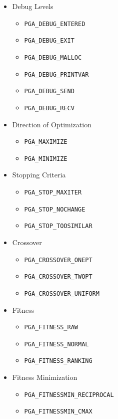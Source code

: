 \documentclass{report}
\begin{document}
\begin{itemize}
\item Debug Levels
\begin{itemize}
\item {\tt PGA\_DEBUG\_ENTERED}
\item {\tt PGA\_DEBUG\_EXIT}
\item {\tt PGA\_DEBUG\_MALLOC}
\item {\tt PGA\_DEBUG\_PRINTVAR}
\item {\tt PGA\_DEBUG\_SEND}
\item {\tt PGA\_DEBUG\_RECV}
\end{itemize}


\item Direction of Optimization
\begin{itemize}
\item {\tt PGA\_MAXIMIZE}
\item {\tt PGA\_MINIMIZE}
\end{itemize}
    
\item Stopping Criteria
\begin{itemize}
\item {\tt PGA\_STOP\_MAXITER}
\item {\tt PGA\_STOP\_NOCHANGE}
\item {\tt PGA\_STOP\_TOOSIMILAR}
\end{itemize}

\item Crossover
\begin{itemize}
\item {\tt PGA\_CROSSOVER\_ONEPT}
\item {\tt PGA\_CROSSOVER\_TWOPT}
\item {\tt PGA\_CROSSOVER\_UNIFORM}
\end{itemize}

\item Fitness
\begin{itemize}
\item {\tt PGA\_FITNESS\_RAW}
\item {\tt PGA\_FITNESS\_NORMAL}
\item {\tt PGA\_FITNESS\_RANKING}
\end{itemize}

\item Fitness Minimization
\begin{itemize}
\item {\tt PGA\_FITNESSMIN\_RECIPROCAL}
\item {\tt PGA\_FITNESSMIN\_CMAX}
\end{itemize}


\end{itemize}
\end{document}
